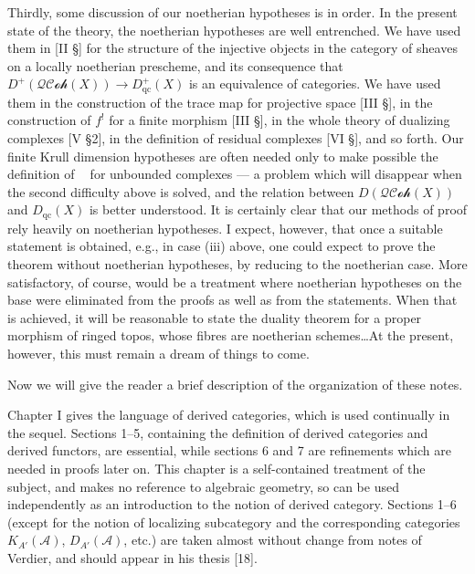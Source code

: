 \documentclass[12pt]{book}
\newcommand{\cat}[1]{\mathcal{#1}}
\DeclareMathOperator{\Rfst}{\mathbf{R}f_*}
\begin{document}
\setcounter{page}{13}

Thirdly, some discussion of our noetherian hypotheses is in order. In the present state of the theory, the noetherian hypotheses are well entrenched. We have used them in [II \S] for the structure of the injective objects in the category of sheaves on a locally noetherian prescheme, and its consequence that \(D^{+}(\cat{QCoh}(X))\to D_{\mathrm{qc}}^{+}(X)\) is an equivalence of categories. We have used them in the construction of the trace map for projective space [III \S], in the construction of \(f^{!}\) for a finite morphism [III \S], in the whole theory of dualizing complexes [V \S2], in the definition of residual complexes [VI \S], and so forth. Our finite Krull dimension hypotheses are often needed only to make possible the definition of \(\Rfst\) for unbounded complexes --- a problem which will disappear when the second difficulty above is solved, and the relation between \(D(\cat{QCoh}(X))\) and \(D_{\mathrm{qc}}(X)\) is better understood. It is certainly clear that our methods of proof rely heavily on noetherian hypotheses. I expect, however, that once a suitable statement is obtained, e.g., in case (iii) above, one could expect to prove the theorem without noetherian hypotheses, by reducing to the noetherian case. More satisfactory, of course, would be a treatment where noetherian hypotheses on the base were eliminated from the proofs as well as from the statements. When that is achieved, it will be reasonable to state the duality theorem for a proper morphism of ringed topos, whose fibres are noetherian schemes\dots At the present, however, this must remain a dream of things to come.

Now we will give the reader a brief description of the organization of these notes.

\setcounter{page}{14}

Chapter I gives the language of derived categories, which is used continually in the sequel. Sections 1--5, containing the definition of derived categories and derived functors, are essential, while sections 6 and 7 are refinements which are needed in proofs later on. This chapter is a self-contained treatment of the subject, and makes no reference to algebraic geometry, so can be used independently as an introduction to the notion of derived category. Sections 1--6 (except for the notion of localizing subcategory and the corresponding categories \(K_{A'}(\cat{A})\), \(D_{A'}(\cat{A})\), etc.) are taken almost without change from notes of Verdier, and should appear in his thesis [18].
\end{document}

